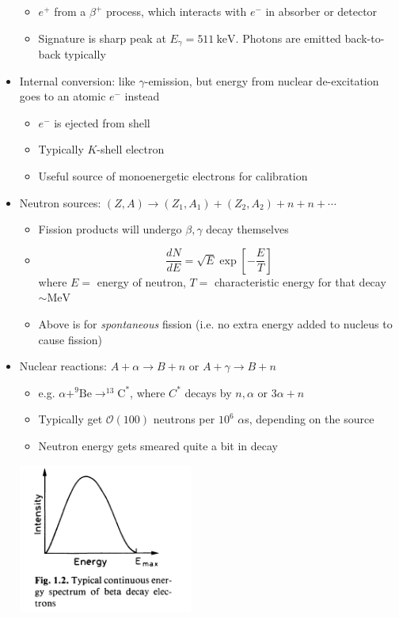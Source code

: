 \documentclass[11pt]{article}
\newcommand{\dd}[2]{\dfrac{d #1}{d #2}}
\newcommand{\kev}{\text{keV}}
\newcommand{\mev}{\text{MeV}}
\newcommand{\el}{\ensuremath{e^{-}}\xspace}
\newcommand{\pos}{\ensuremath{e^{+}}\xspace}
\newcommand{\ord}[1]{\ensuremath{\mathcal{O}(#1)}}
\begin{document}
\begin{itemize}
  \begin{itemize}
    \item $\pos$ from a $\beta^+$ process, which interacts with $\el$ in absorber or detector
    \item Signature is sharp peak at $E_\gamma = 511~\kev$. Photons are emitted back-to-back typically
  \end{itemize}
  \item Internal conversion: like $\gamma$-emission, but energy from nuclear de-excitation goes to an atomic $\el$ instead
  \begin{itemize}
    \item $\el$ is ejected from shell
    \item Typically $K$-shell electron
    \item Useful source of monoenergetic electrons for calibration
  \end{itemize}
  \item Neutron sources: $(Z,A)\rightarrow (Z_1,A_1)  + (Z_2,A_2) + n + n + \cdots$
  \begin{itemize}
    \item Fission products will undergo $\beta,\gamma$ decay themselves
    \item 
    \begin{equation}
      \dd{N}{E} = \sqrt{E} \exp \left[-\frac{E}{T}\right]
    \end{equation}
    where $E =$ energy of neutron, $T =$ characteristic energy for that decay $\sim\mev$
    \item Above is for \emph{spontaneous} fission (i.e. no extra energy added to nucleus to cause fission)
  \end{itemize}
  \item Nuclear reactions: $A+\alpha\rightarrow B+n$ or $A+\gamma \rightarrow B+n$
  \begin{itemize}
    \item e.g. $\alpha + ^9\text{Be} \rightarrow ^{13}\text{C}^*$, where $C^*$ decays by $n,\alpha$ or $3\alpha+n$
    \item Typically get $\ord{100}$ neutrons per $10^6$ $\alpha$s, depending on the source
    \item Neutron energy gets smeared quite a bit in decay
  \end{itemize}
\begin{center}
  \includegraphics[width=0.45\textwidth,valign=t]{figs/q_beta.png}

\end{center}
\end{itemize}
\end{document}
